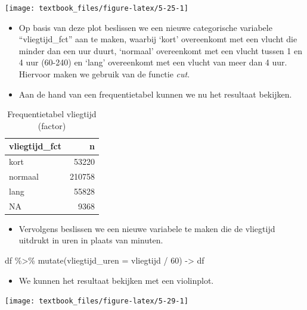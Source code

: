 \documentclass[]{tufte-book}
\newenvironment{Shaded}{}{}
\newcommand{\AttributeTok}[1]{\textcolor[rgb]{0.49,0.56,0.16}{#1}}
\newcommand{\DecValTok}[1]{\textcolor[rgb]{0.25,0.63,0.44}{#1}}
\newcommand{\FunctionTok}[1]{\textcolor[rgb]{0.02,0.16,0.49}{#1}}
\newcommand{\NormalTok}[1]{#1}
\newcommand{\OtherTok}[1]{\textcolor[rgb]{0.00,0.44,0.13}{#1}}
\newcommand{\SpecialCharTok}[1]{\textcolor[rgb]{0.25,0.44,0.63}{#1}}
\providecommand{\tightlist}{%
  \setlength{\itemsep}{0pt}\setlength{\parskip}{0pt}}
\begin{document}
\texttt{[image: textbook\_files/figure-latex/5-25-1]}

\begin{itemize}
\item
  Op basis van deze plot beslissen we een nieuwe categorische variabele ``vliegtijd\_fct'' aan te maken, waarbij `kort' overeenkomt met een vlucht die minder dan een uur duurt, `normaal' overeenkomt met een vlucht tussen 1 en 4 uur (60-240) en `lang' overeenkomt met een vlucht van meer dan 4 uur. Hiervoor maken we gebruik van de functie \emph{cut}.
\item
  Aan de hand van een frequentietabel kunnen we nu het resultaat bekijken.
\end{itemize}

\begin{table}

\caption{\label{tab:5-27b}Frequentietabel vliegtijd (factor)}
\centering
\fontsize{10}{12}\selectfont
\begin{tabular}[t]{lr}
\toprule
vliegtijd\_fct & n\\
\midrule
kort & 53220\\
normaal & 210758\\
lang & 55828\\
NA & 9368\\
\bottomrule
\end{tabular}
\end{table}

\begin{itemize}
\tightlist
\item
  Vervolgens beslissen we een nieuwe variabele te maken die de vliegtijd uitdrukt in uren in plaats van minuten.
\end{itemize}

\begin{Shaded}
\begin{Highlighting}[]
\NormalTok{df }\SpecialCharTok{\%\textgreater{}\%}
  \FunctionTok{mutate}\NormalTok{(}\AttributeTok{vliegtijd\_uren =}\NormalTok{ vliegtijd }\SpecialCharTok{/} \DecValTok{60}\NormalTok{) }\OtherTok{{-}\textgreater{}}\NormalTok{ df}
\end{Highlighting}
\end{Shaded}

\begin{itemize}
\tightlist
\item
  We kunnen het resultaat bekijken met een violinplot.
\end{itemize}

\texttt{[image: textbook\_files/figure-latex/5-29-1]}
\end{document}
